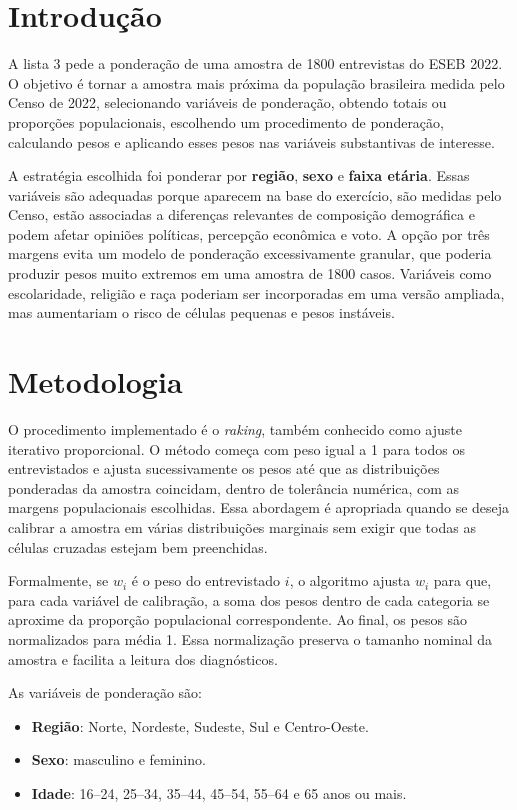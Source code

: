 \documentclass[11pt,a4paper]{article}
\begin{document}
\section*{Introdução}

A lista 3 pede a ponderação de uma amostra de 1800 entrevistas do ESEB 2022. O objetivo é tornar a amostra mais próxima da população brasileira medida pelo Censo de 2022, selecionando variáveis de ponderação, obtendo totais ou proporções populacionais, escolhendo um procedimento de ponderação, calculando pesos e aplicando esses pesos nas variáveis substantivas de interesse.

A estratégia escolhida foi ponderar por \textbf{região}, \textbf{sexo} e \textbf{faixa etária}. Essas variáveis são adequadas porque aparecem na base do exercício, são medidas pelo Censo, estão associadas a diferenças relevantes de composição demográfica e podem afetar opiniões políticas, percepção econômica e voto. A opção por três margens evita um modelo de ponderação excessivamente granular, que poderia produzir pesos muito extremos em uma amostra de 1800 casos. Variáveis como escolaridade, religião e raça poderiam ser incorporadas em uma versão ampliada, mas aumentariam o risco de células pequenas e pesos instáveis.

\section*{Metodologia}

O procedimento implementado é o \textit{raking}, também conhecido como ajuste iterativo proporcional. O método começa com peso igual a 1 para todos os entrevistados e ajusta sucessivamente os pesos até que as distribuições ponderadas da amostra coincidam, dentro de tolerância numérica, com as margens populacionais escolhidas. Essa abordagem é apropriada quando se deseja calibrar a amostra em várias distribuições marginais sem exigir que todas as células cruzadas estejam bem preenchidas.

Formalmente, se \(w_i\) é o peso do entrevistado \(i\), o algoritmo ajusta \(w_i\) para que, para cada variável de calibração, a soma dos pesos dentro de cada categoria se aproxime da proporção populacional correspondente. Ao final, os pesos são normalizados para média 1. Essa normalização preserva o tamanho nominal da amostra e facilita a leitura dos diagnósticos.

As variáveis de ponderação são:
\begin{itemize}
\item \textbf{Região}: Norte, Nordeste, Sudeste, Sul e Centro-Oeste.
\item \textbf{Sexo}: masculino e feminino.
\item \textbf{Idade}: 16--24, 25--34, 35--44, 45--54, 55--64 e 65 anos ou mais.
\end{itemize}
\end{document}
